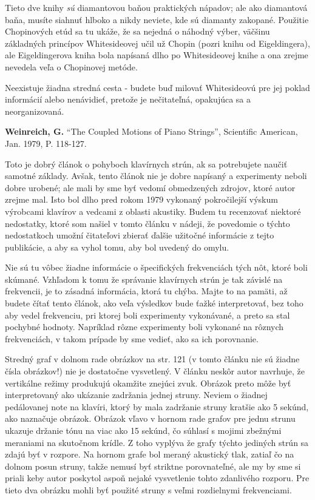 \documentclass[11pt,a4paper]{book}
\begin{document}
Tieto dve knihy \textit{sú} diamantovou baňou praktických nápadov; ale ako diamantová baňa, musíte siahnuť hlboko a nikdy neviete, kde sú diamanty zakopané. Použitie Chopinových etúd sa tu ukáže, že sa nejedná o náhodný výber, väčšinu základných princípov Whitesideovej učil už Chopin (pozri knihu od Eigeldingera), ale Eigeldingerova kniha bola napísaná dlho po Whitesideovej knihe a ona zrejme nevedela veľa o Chopinovej metóde. 

Neexistuje žiadna stredná cesta - budete buď milovať Whitesideovú pre jej poklad informácií alebo nenávidieť, pretože je nečitateľná, opakujúca sa a neorganizovaná.

\textbf{\hypertarget{r:weinreich}{Weinreich, G.}} “The Coupled Motions of Piano Strings”, Scientific American, Jan. 1979, P. 118-127. 

Toto je dobrý článok o pohyboch klavírnych strún, ak sa potrebujete naučiť samotné základy. Avšak, tento článok nie je dobre napísaný a experimenty neboli dobre urobené; ale mali by sme byť vedomí obmedzených zdrojov, ktoré autor zrejme mal. Isto bol dlho pred rokom 1979 vykonaný pokročilejší výskum výrobcami klavírov a vedcami z oblasti akustiky. Budem tu recenzovať niektoré nedostatky, ktoré som našiel v tomto článku v nádeji, že povedomie o týchto nedostatkoch umožní čitateľovi zbierať ďalšie užitočné informácie z tejto publikácie, a aby sa  vyhol tomu, aby bol uvedený do omylu. 

Nie sú tu vôbec žiadne informácie o špecifických frekvenciách tých nôt, ktoré boli skúmané. Vzhľadom k tomu že správanie klavírnych strún je tak závislé na frekvencii, je to zásadná informácia, ktorá tu chýba. Majte to na pamäti, až budete čítať tento článok, ako veľa výsledkov bude ťažké interpretovať, bez toho aby vedel frekvenciu, pri ktorej boli experimenty vykonávané, a preto sa stal pochybné hodnoty. Napríklad rôzne experimenty boli vykonané na rôznych frekvenciách, v takom prípade by sme vedieť, ako sa ich porovnanie. 

Stredný graf v dolnom rade obrázkov na str. 121 (v tomto článku nie sú žiadne čísla obrázkov!) nie je dostatočne vysvetlený. V článku neskôr autor navrhuje, že vertikálne režimy produkujú okamžite znejúci zvuk. Obrázok preto môže byť interpretovaný ako ukázanie zadržania jednej struny. Neviem o žiadnej pedálovanej note na klavíri, ktorý by mala zadržanie struny kratšie ako 5 sekúnd, ako naznačuje obrázok. Obrázok vľavo v hornom rade grafov pre jednu strunu ukazuje držanie tónu na viac ako 15 sekúnd, čo súhlasí s mojimi zbežnými meraniami na skutočnom krídle. Z toho vyplýva že grafy týchto jediných strún sa zdajú byť v rozpore. Na hornom grafe bol meraný akustický tlak, zatiaľ čo na dolnom posun struny, takže nemusí byť striktne porovnateľné, ale my by sme si priali keby autor poskytol aspoň nejaké vysvetlenie tohto zdanlivého rozporu. Pre tieto dva obrázku mohli byť použité struny s veľmi rozdielnymi frekvenciami. 
\end{document}
